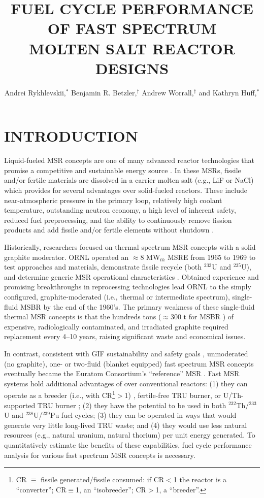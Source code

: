 \documentclass{anstrans}
\title{FUEL CYCLE PERFORMANCE OF FAST SPECTRUM \\
  MOLTEN SALT REACTOR DESIGNS}
\author{Andrei Rykhlevskii,$^{*}$ Benjamin R. Betzler,$^{\dagger}$ Andrew Worrall,$^{\dagger}$ and Kathryn Huff,$^{*}$}
\institute{
$^{*}$Dept. of Nuclear, Plasma, and Radiological Engineering, University of Illinois at 
  Urbana-Champaign, Urbana, IL \\ andreir2@illinois.edu
\and
$^{\dagger}$Oak Ridge National Laboratory, 1 Bethel Valley Road, Oak Ridge, TN, USA
}
\begin{document}
\section{INTRODUCTION} 
\label{sec:intro}
Liquid-fueled \gls{MSR} concepts are one of many advanced reactor technologies that promise a competitive and sustainable energy source \cite{siemer_why_2015}. In these \gls{MSR}s, fissile and/or fertile materials are dissolved in a carrier molten salt (e.g., LiF or NaCl) which provides for several advantages over solid-fueled reactors. These include near-atmospheric pressure in the primary loop, relatively high coolant temperature, outstanding neutron economy, a high level of inherent safety,
reduced fuel preprocessing, and the ability to continuously remove fission products and add fissile and/or fertile elements without shutdown \cite{leblanc_molten_2010}. 

Historically, researchers focused on thermal spectrum \gls{MSR} concepts with a solid graphite moderator.  \gls{ORNL} operated an $\approx$8 MW$_{th}$ \gls{MSRE} from 1965 to 1969 to test approaches and materials, demonstrate fissile recycle (both $^{233}$U and $^{235}$U), and determine generic \gls{MSR} operational characteristics \cite{macpherson_molten_1985}. Obtained experience and promising breakthroughs in reprocessing technologies \cite{whatley_engineering_1970} lead \gls{ORNL} to the simply configured, graphite-moderated (i.e., thermal or intermediate spectrum), single-fluid \gls{MSBR} by the end of the 1960's. The primary weakness of these single-fluid thermal \gls{MSR} concepts is that the hundreds tons ($\approx$300 t for \gls{MSBR} \cite{robertson_conceptual_1971}) of expensive, radiologically contaminated, and irradiated graphite required replacement every 4--10 years, raising significant waste and economical issues.

In contrast, consistent with \gls{GIF} sustainability and safety goals \cite{gif_generation_2015}, unmoderated (no graphite), one- or two-fluid (blanket equipped) fast spectrum \gls{MSR} concepts eventually became the Euratom Consortium's ``reference'' \gls{MSR} \cite{noauthor_final_2015}. Fast \gls{MSR} systems hold additional advantages of over conventional reactors: 
(1) they can operate as a breeder (i.e., with \gls{CR}\footnote{\gls{CR} $\equiv$ fissile generated/fissile consumed: if CR$<$1 the reactor is a ``converter''; CR$\equiv$1, an ``isobreeder''; CR$>$1, a ``breeder''.}$>$1) \cite{noauthor_final_2015,simmons_assessment_1974,mourogov_potentialities_2006}, fertile-free \gls{TRU} burner, or U/Th-supported \gls{TRU} burner \cite{ignatiev_progress_2007}; 
(2) they have the potential to be used in both $^{232}$Th/$^{233}$U and $^{238}$U/$^{239}$Pu fuel cycles; 
(3) they can be operated in ways that would generate very little long-lived \gls{TRU} waste; and 
(4) they would use less natural resources (e.g., natural uranium, natural thorium) per unit energy generated. To quantitatively estimate the benefits of these capabilities, fuel cycle performance analysis for various fast spectrum \gls{MSR} concepts is necessary.
\end{document}

